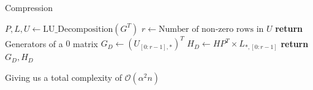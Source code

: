 \begin{frame}{Compression}
  \begin{algorithm}[H]
    \caption{Generator Compression}
    \begin{algorithmic}[1]
      \State $P, L, U \gets \text{LU\_Decomposition}(G^T)$
      \State $r \gets \text{Number of non-zero rows in } U$
      \State \textbf{return} Generators of a $0$ matrix
      \EndIf
      \State $G_{D} \gets (U_{[0:r-1],*})^T$ 
      \State $H_{D} \gets H P^T \times L_{*,[0:r-1]}$
      \State \textbf{return} $G_D, H_D$ 
      \EndFunction
    \end{algorithmic}
  \end{algorithm}

  Giving us a total complexity of $\mathcal{O}(\alpha^2 n)$
\end{frame}
